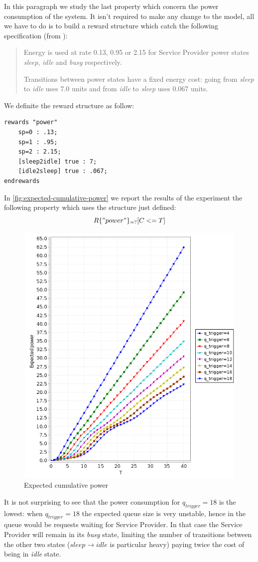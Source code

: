 In this paragraph we study the last property which concern the power
consumption of the system. It isn't required to make any change to the
model, all we have to do is to build a reward structure which catch
the following specification (from \cite{QWP99}):
\begin{quote}
  Energy is used at rate 0.13, 0.95 or 2.15 for Service Provider power
  states \emph{sleep}, \emph{idle} and \emph{busy} respectively.

  Transitions between power states have a fixed energy cost: going
  from \emph{sleep} to \emph{idle} uses 7.0 units and from \emph{idle}
  to \emph{sleep} uses 0.067 units.
\end{quote}
We definite the reward structure as follow:
\begin{verbatim}
rewards "power"
	sp=0 : .13;
	sp=1 : .95;
	sp=2 : 2.15;
	[sleep2idle] true : 7;
	[idle2sleep] true : .067;
endrewards
\end{verbatim}

In \autoref{fig:expected-cumulative-power} we report the results of the
experiment the following property which uses the structure just
defined:
\begin{displaymath}
  R\{"power"\}_{=?} [ C<=T ]
\end{displaymath}
\begin{figure}[htb]
  \centering
  \includegraphics[width=13cm,
  height=13cm]{quantitative-project/expected-power.png}
  \caption{Expected cumulative power}
  \label{fig:expected-cumulative-power}
\end{figure}
It is not surprising to see that the power consumption for
$q_{trigger}=18$ is the lowest: when $q_{trigger} = 18$ the expected
queue size is very unstable, hence in the queue would be requests
waiting for Service Provider. In that case the Service Provider will
remain in its \emph{busy} state, limiting the number of transitions
between the other two states ($sleep \rightarrow idle$ is particular
heavy) paying twice the cost of being in \emph{idle} state.

